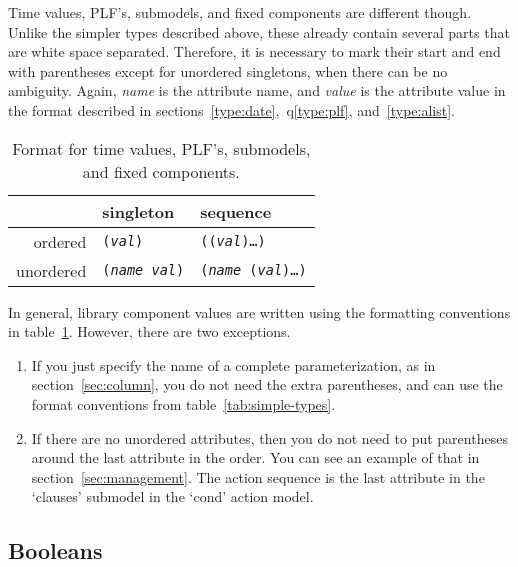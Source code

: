Time values, PLF's, submodels, and fixed components are different
though.  Unlike the simpler types described above, these already
contain several parts that are white space separated.  Therefore, it
is necessary to mark their start and end with parentheses except for
unordered singletons, when there can be no ambiguity.  Again,
\emph{name} is the attribute name, and \emph{value} is the attribute
value in the format described in sections~\ref{type:date},~q\ref{type:plf}, and~\ref{type:alist}.

\begin{table}[htbp]
  \begin{center}
    \begin{tabular}{|r|l|l|} \hline
                & singleton           
                & sequence \\\hline
        ordered & \texttt{(\emph{val})} 
                & \texttt{((\emph{val})\ldots{})} \\\hline
      unordered & \texttt{(\emph{name} \emph{val})}
                & \texttt{(\emph{name} (\emph{val})\ldots{})}\\\hline
  \end{tabular}

  \end{center}
\caption{Format for time values, PLF's, submodels, and fixed
    components.} 
  \label{tab:complex-types}
\end{table}

In general, library component values are written using the formatting
conventions in table~\ref{tab:complex-types}.  However, there are two
exceptions.
\begin{enumerate}
\item If you just specify the name of a complete parameterization, as
  in section~\ref{sec:column}, you do not need the extra parentheses,
  and can use the format conventions from
  table~\ref{tab:simple-types}. 
\item If there are no unordered attributes, then you do not need to
  put parentheses around the last attribute in the order.  You can see
  an example of that in section~\ref{sec:management}.  The action
  sequence is the last attribute in the `clauses' submodel in the
  `cond' action model.
\end{enumerate}

\subsection{Booleans}
\label{type:boolean}

